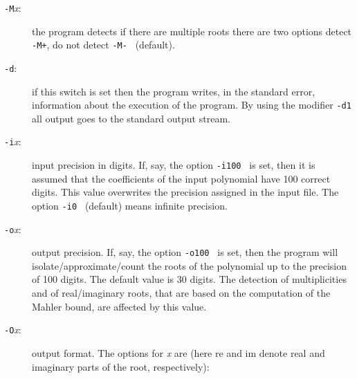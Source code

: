 \documentclass{article}
\begin{document}
\begin{description}
   \item[{\tt -M}{\em x}:] the program detects if there are multiple  roots
   there are two options detect {\tt -M+}, do not detect {\tt -M- } (default).
   \item[{\tt -d}:] if this switch is set then the program writes, in the 
    standard error, information about the execution of the program.
    By using the modifier {\tt -d1} all output goes to the standard output
    stream.
   \item[{\tt -i}{\em x}:] input precision in digits.  
        If, say, the option {\tt -i100 } is set, then it is assumed
        that the coefficients of the input polynomial have 100 correct
        digits. This value overwrites the precision assigned in the
        input file. The option {\tt -i0 } (default) means infinite
        precision.

\item[{\tt -o}{\em x}:] output precision.
        If, say, the option {\tt -o100 } is set, then the program will
        isolate/approximate/count the roots of the polynomial up to
        the precision of 100 digits. The default value is 30 digits.
        The detection of multiplicities and of real/imaginary roots,
        that are based on the computation of the Mahler bound, are
        affected by this value.

\item[{\tt -O}{\em x}:] output format. The options for {\em x} are 
                (here re and im denote real and imaginary parts of
                the root, respectively):


\end{description}
\end{document}
